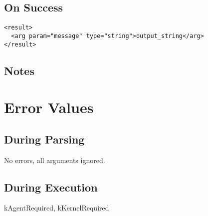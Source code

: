 \documentclass[10pt]{article}
\begin{document}
\subsection*{ On Success }
\begin{verbatim}
<result>
  <arg param="message" type="string">output_string</arg>
</result>

\end{verbatim}
\subsection*{ Notes }
\section*{ Error Values }
\subsection*{ During Parsing }


 No errors, all arguments ignored. 
\subsection*{ During Execution }


 kAgentRequired, kKernelRequired
\end{document}
